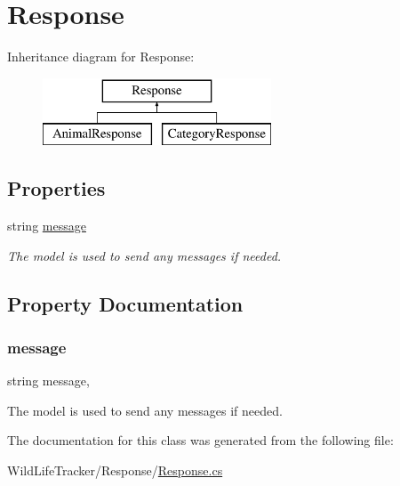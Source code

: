 \hypertarget{classWildLifeTracker_1_1Response_1_1Response}{}\section{Response}
\label{classWildLifeTracker_1_1Response_1_1Response}
Inheritance diagram for Response\+:\begin{figure}[H]
\begin{center}
\leavevmode
\includegraphics[height=2.000000cm]{classWildLifeTracker_1_1Response_1_1Response}
\end{center}
\end{figure}
\subsection*{Properties}
\begin{DoxyCompactItemize}
\item 
string \hyperlink{classWildLifeTracker_1_1Response_1_1Response_ae1ed0d7a6f352c7ee3ad978429822c6f}{message}
\begin{DoxyCompactList}\small\item\em The model is used to send any messages if needed. \end{DoxyCompactList}\end{DoxyCompactItemize}


\subsection{Property Documentation}
\mbox{\label{classWildLifeTracker_1_1Response_1_1Response_ae1ed0d7a6f352c7ee3ad978429822c6f}} 
\subsubsection{\texorpdfstring{message}{message}}
{\footnotesize\ttfamily string message\hspace{0.3cm}{\ttfamily [get]}, {\ttfamily [set]}}



The model is used to send any messages if needed. 



The documentation for this class was generated from the following file\+:\begin{DoxyCompactItemize}
\item 
Wild\+Life\+Tracker/\+Response/\hyperlink{Response_8cs}{Response.\+cs}\end{DoxyCompactItemize}
